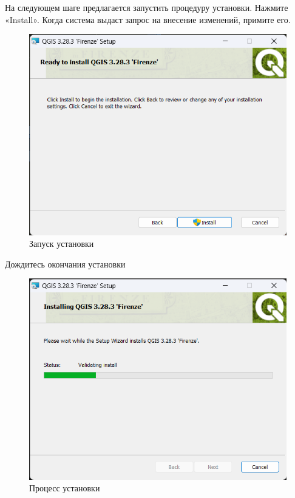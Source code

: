 \documentclass[
  12pt,
]{book}
\begin{document}
На следующем шаге предлагается запустить процедуру установки. Нажмите «Install». Когда система выдаст запрос на внесение изменений, примите его.

\begin{figure}
\centering
\includegraphics{images/installation_instruction_win/win04.png}
\caption{Запуск установки}
\end{figure}

Дождитесь окончания установки

\begin{figure}
\centering
\includegraphics{images/installation_instruction_win/win05.png}
\caption{Процесс установки}
\end{figure}
\end{document}

